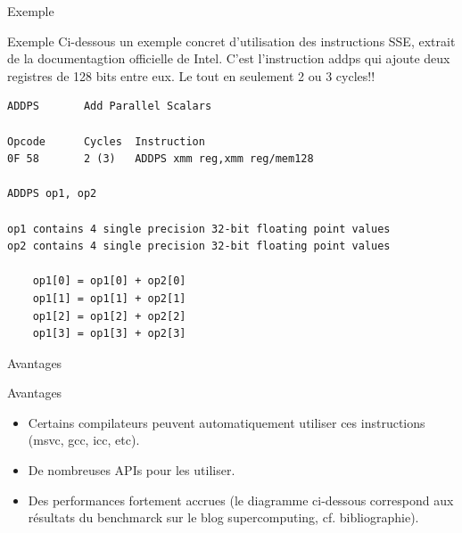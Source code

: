 \documentclass{beamer}
\begin{document}
\begin{frame}[fragile]{Exemple}
    \begin{block}{Exemple}
    Ci-dessous un exemple concret d'utilisation des instructions SSE, extrait de
    la documentagtion officielle de Intel. C'est l'instruction addps qui ajoute 
    deux registres de 128 bits entre eux. Le tout en seulement 2 ou 3 cycles!!
    \end{block}
\tiny
    \begin{verbatim}
ADDPS		Add Parallel Scalars

Opcode      Cycles  Instruction
0F 58       2 (3)   ADDPS xmm reg,xmm reg/mem128

ADDPS op1, op2

op1 contains 4 single precision 32-bit floating point values
op2 contains 4 single precision 32-bit floating point values

	op1[0] = op1[0] + op2[0]
	op1[1] = op1[1] + op2[1]
	op1[2] = op1[2] + op2[2]
	op1[3] = op1[3] + op2[3]
    \end{verbatim}
\small

\end{frame}


\begin{frame}{Avantages}
    \begin{block}{Avantages}
        \begin{itemize}
        \item Certains compilateurs peuvent automatiquement utiliser ces instructions (msvc, gcc, icc, etc).
        \item De nombreuses APIs pour les utiliser.    
        \item Des performances fortement accrues (le diagramme ci-dessous correspond aux 
        résultats du benchmarck sur le blog supercomputing, cf. bibliographie).
        \end{itemize}

        \tiny

        \begin{center}
        \end{center}

        \small

    \end{block}
\end{frame}
\end{document}

